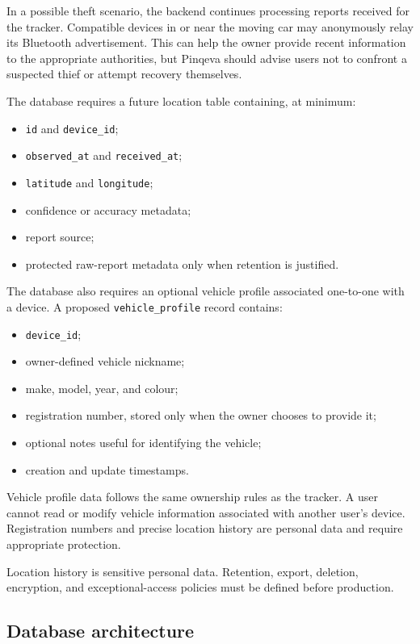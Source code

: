 \documentclass[12pt,a4paper]{article}
\newcommand{\code}[1]{\texttt{#1}}
\begin{document}
In a possible theft scenario, the backend continues processing reports received
for the tracker. Compatible devices in or near the moving car may anonymously
relay its Bluetooth advertisement. This can help the owner provide recent
information to the appropriate authorities, but Pinqeva should advise users not
to confront a suspected thief or attempt recovery themselves.

The database requires a future location table containing, at minimum:

\begin{itemize}
    \item \code{id} and \code{device\_id};
    \item \code{observed\_at} and \code{received\_at};
    \item \code{latitude} and \code{longitude};
    \item confidence or accuracy metadata;
    \item report source;
    \item protected raw-report metadata only when retention is justified.
\end{itemize}

The database also requires an optional vehicle profile associated one-to-one
with a device. A proposed \code{vehicle\_profile} record contains:

\begin{itemize}
    \item \code{device\_id};
    \item owner-defined vehicle nickname;
    \item make, model, year, and colour;
    \item registration number, stored only when the owner chooses to provide it;
    \item optional notes useful for identifying the vehicle;
    \item creation and update timestamps.
\end{itemize}

Vehicle profile data follows the same ownership rules as the tracker. A user
cannot read or modify vehicle information associated with another user's
device. Registration numbers and precise location history are personal data and
require appropriate protection.

Location history is sensitive personal data. Retention, export, deletion,
encryption, and exceptional-access policies must be defined before production.

\subsection{Database architecture}
\end{document}
